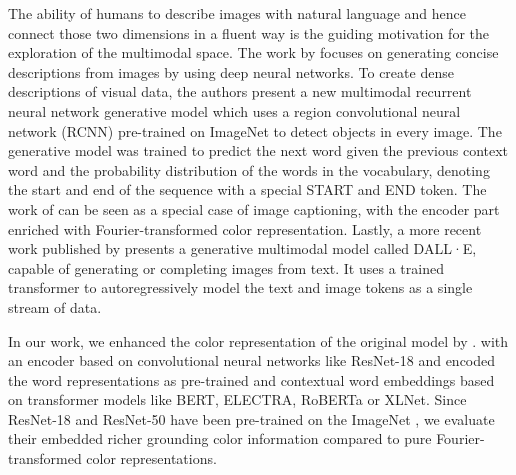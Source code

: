 \par
The ability of humans to describe images with natural language and hence connect those two dimensions in a fluent way is the guiding motivation for the exploration of the multimodal space. The work by \citep{karpathy-2014-image_descriptions} focuses on generating concise descriptions from images by using deep neural networks. To create dense descriptions of visual data, the authors present a new multimodal recurrent neural network generative model which uses a region convolutional neural network (RCNN) pre-trained on ImageNet \citep{deng-2009-imagenet} to detect objects in every image. The generative model was trained to predict the next word given the previous context word and the probability distribution of the words in the vocabulary, denoting the start and end of the sequence with a special START and END token. The work of \citep{monroe-2017-colors} can be seen as a special case of image captioning, with the encoder part enriched with Fourier-transformed color representation. Lastly, a more recent work published by \citep{openai-2020-dalle} presents a generative multimodal model called DALL·E, capable of generating or completing images from text. It uses a trained transformer to autoregressively model the text and image tokens as a single stream of data.

\par
In our work, we enhanced the color representation of the original model by \citep{monroe-2017-colors}. with an encoder based on convolutional neural networks like ResNet-18 and encoded the word representations as pre-trained and contextual word embeddings based on transformer models like BERT, ELECTRA, RoBERTa or XLNet. Since ResNet-18 and ResNet-50 have been pre-trained on the ImageNet \citep{imagenet-2019-dataset}, we evaluate their embedded richer grounding color information compared to pure Fourier-transformed color representations.
